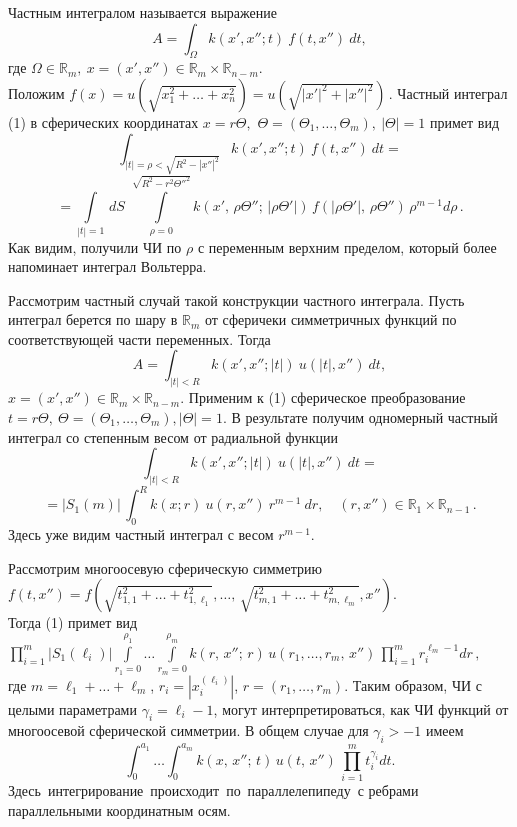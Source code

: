 
\vzmscaption

Частным интегралом называется выражение
\begin{equation}\label{1}
A=\int_{\Omega}k(x',x''; t)~f(t,x'')~dt, 
\end{equation}
где $\Omega\in\mathbb{R}_m,~x=(x',x'')\in\mathbb{R}_{m}\times\mathbb{R}_{n-m}$.\\
Положим
$
f(x)=u\left(\sqrt{x_1^2+\ldots+x_n^2}\right)=
u\left(\sqrt{|x'|^2+|x''|^2}\right)\,. 
$
Частный интеграл (1) в сферических координатах
$ x=r\Theta,$ $\Theta=(\Theta_1,\ldots,\Theta_m),~|\Theta|=1$
примет вид 
$$
\int_{|t|=\rho<\sqrt{R^2-|x''|^2}}k(x',x''; t)~f(t,x'')~dt=
$$
$$=
\int\limits_{|t|=1} \,dS\,\,\int\limits_{\rho=0}^{\sqrt{R^2-r^2\Theta''^2}} k(x',\,\rho\Theta'';\, |\rho\Theta'|)\, f(|\rho\Theta'|,\, \rho\Theta'')\, \rho^{m-1} d\rho\,.
$$
Как видим, получили ЧИ по $\rho$ с переменным верхним пределом, который более напоминает интеграл Вольтерра.

Рассмотрим частный случай такой конструкции частного интеграла. Пусть интеграл берется по шару в $\mathbb{R}_m$ от сферичеки симметричных функций
по соответствующей части переменных. Тогда 
$$
A=\int_{|t|<R}k(x',x''; |t|)~u(|t|,x'')~dt,
$$
$x=(x',x'')\in\mathbb{R}_m\times\mathbb{R}_{n-m}$. Применим к (1) сферическое преобразование $t=r\Theta,~\Theta=(\Theta_1,\ldots,\Theta_m), |\Theta|=1$. В результате получим одномерный частный интеграл со степенным весом от радиальной функции
$$
\int_{|t|<R}k(x',x''; |t|)~u(|t|,x'')~dt=
$$
$$=
|S_1(m)|\,\int_0^R k(x; r)~u(r,x'')~r^{m-1}~dr,\quad (r,x'')\in\mathbb{R}_1\times\mathbb{R}_{n-1}\,.
$$ 
Здесь уже видим частный интеграл с весом $r^{m-1}$.

Рассмотрим многоосевую сферическую симметрию\\
$f(t,x'')=f\left(\sqrt{t_{1,1}^2+\ldots+ 
t_{1,\ell_1}^2},\ldots,\,\sqrt{t_{m,1}^2+\ldots+ 
t_{m,\ell_m}^2}, x'' \right).
$\\
Тогда (1) примет вид\\
$
\prod\limits_{i=1}^m |S_1(\ell_i)|\int\limits_{r_1=0}^{\rho_1}\ldots \int\limits_{r_m=0}^{\rho_m} k(r,\,x'';\,r )\, u(r_1,\ldots, r_m,\, x'')\, \prod\limits_{i=1}^m r_i^{\ell_m-1} d r\,,
$ \\
где $m=\ell_1+\ldots+\ell_m$, $r_i=|x_i^{(\ell_i)}|$, $r=(r_1,\ldots,r_m)$.
Таким образом, ЧИ с целыми параметрами $\gamma_i=\ell_i-1$, могут интерпретироваться, как ЧИ функций от многоосевой сферической симметрии. 
В общем случае для $\gamma_i>-1$ имеем 
$$
\int_{0}^{a_1}\ldots \int_{0}^{a_m} k(x,\,x'';\,t)\, u(t,\, x'')\, \prod\limits_{i=1}^m t_i^{\gamma_i} d t.
$$ 
Здесь\, интегрирование\, происходит\, по\, параллелепипеду\, с ребрами параллельными координатным осям.

